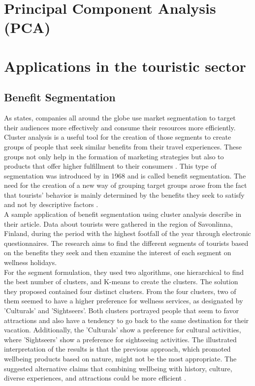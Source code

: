 \section{Principal Component Analysis (PCA)}


\section{Applications in the touristic sector}
\subsection{Benefit Segmentation}
As \textcite{data-drivenSegmentation} states, companies all around the globe use market segmentation to target their audiences more effectively and consume their resources more efficiently. Cluster analysis is a useful tool for the creation of those segments to create groups of people that seek similar benefits from their travel experiences. These groups not only help in the formation of marketing strategies but also to products that offer higher fulfillment to their consumers \autocite[17]{data-drivenSegmentation}. This type of segmentation was introduced by \textcite{Haley} in 1968 and is called benefit segmentation. The need for the creation of a new way of grouping target groups arose from the fact that tourists' behavior is mainly determined by the benefits they seek to satisfy and not by descriptive factors \autocite[31]{Haley}. \\
A sample application of benefit segmentation using cluster analysis describe \textcite{finland} in their article. Data about tourists were gathered in the region of Savonlinna, Finland, during the period with the highest footfall of the year through electronic questionnaires. The research aims to find the different segments of tourists based on the benefits they seek and then examine the interest of each segment on wellness holidays. \\
For the segment formulation, they used two algorithms, one hierarchical to find the best number of clusters, and K-means to create the clusters. The solution they proposed contained four distinct clusters. From the four clusters, two of them seemed to have a higher preference for wellness services, as designated by \textcite{finland} 'Culturals' and 'Sightseers'. Both clusters portrayed people that seem to favor attractions and also have a tendency to go back to the same destination for their vacation. Additionally, the 'Culturals' show a preference for cultural activities, where 'Sightseers' show a preference for sightseeing activities. The illustrated interpretation of the results is that the previous approach, which promoted wellbeing products based on nature, might not be the most appropriate. The suggested alternative claims that combining wellbeing with history, culture, diverse experiences, and attractions could be more efficient \autocite[308-312]{finland}. \\
